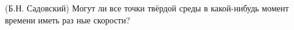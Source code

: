 (Б.Н. Садовский)
Могут ли все точки твёрдой среды в какой-нибудь момент времени иметь раз
ные скорости?
